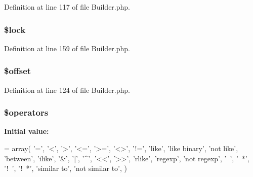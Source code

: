 Definition at line 117 of file Builder.\+php.

\subsubsection[{\$lock}]{\setlength{\rightskip}{0pt plus 5cm}\${\bf lock}}\label{class_illuminate_1_1_database_1_1_query_1_1_builder_af42e78ece9ec638f2928b3bef452d3e1}


Definition at line 159 of file Builder.\+php.

\subsubsection[{\$offset}]{\setlength{\rightskip}{0pt plus 5cm}\${\bf offset}}\label{class_illuminate_1_1_database_1_1_query_1_1_builder_aec4de82415d7f05cb9748d12d3a95a87}


Definition at line 124 of file Builder.\+php.

\subsubsection[{\$operators}]{\setlength{\rightskip}{0pt plus 5cm}\$operators\hspace{0.3cm}{\ttfamily [protected]}}\label{class_illuminate_1_1_database_1_1_query_1_1_builder_a1a526a18e63270ba6814d699637f22bf}
{\bfseries Initial value\+:}
\begin{DoxyCode}
= array(
        \textcolor{charliteral}{'='}, \textcolor{charliteral}{'<'}, \textcolor{charliteral}{'>'}, \textcolor{stringliteral}{'<='}, \textcolor{stringliteral}{'>='}, \textcolor{stringliteral}{'<>'}, \textcolor{stringliteral}{'!='},
        \textcolor{stringliteral}{'like'}, \textcolor{stringliteral}{'like binary'}, \textcolor{stringliteral}{'not like'}, \textcolor{stringliteral}{'between'}, \textcolor{stringliteral}{'ilike'},
        \textcolor{charliteral}{'&'}, \textcolor{charliteral}{'|'}, \textcolor{charliteral}{'^'}, \textcolor{stringliteral}{'<<'}, \textcolor{stringliteral}{'>>'},
        \textcolor{stringliteral}{'rlike'}, \textcolor{stringliteral}{'regexp'}, \textcolor{stringliteral}{'not regexp'},
        \textcolor{charliteral}{'~'}, \textcolor{stringliteral}{'~*'}, \textcolor{stringliteral}{'!~'}, \textcolor{stringliteral}{'!~*'}, \textcolor{stringliteral}{'similar to'},
                \textcolor{stringliteral}{'not similar to'},
    )
\end{DoxyCode}


